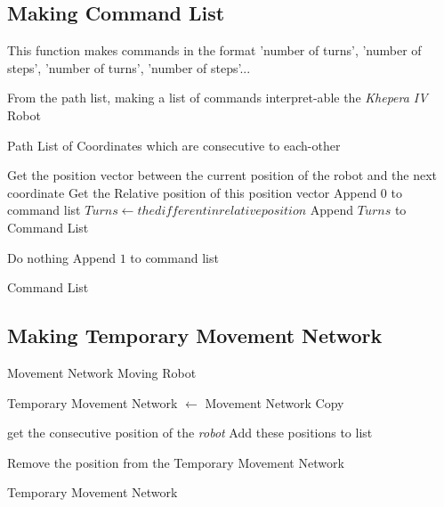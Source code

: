 \subsection{Making Command List}

This function makes commands in the format 'number of turns', 'number of steps', 'number of turns', 'number of steps'...

\label{function:make_command_list}
\begin{algorithm}
\caption{From the path list, making a list of commands interpret-able the \textit{Khepera IV} Robot}
\begin{algorithmic}
\REQUIRE Path List of Coordinates which are consecutive to each-other

    \STATE Get the position vector between the current position of the robot and the next coordinate
    \STATE Get the Relative position of this position vector
        \STATE Append $0$ to command list
        \STATE $Turns \leftarrow the different in relative position$
        \STATE Append $Turns$ to Command List 
    
    
        \STATE Do nothing
        \STATE Append $1$ to command list
    
    
\ENDIF
\ENDFOR

\RETURN Command List


\end{algorithmic}
\end{algorithm}


\subsection{Making Temporary Movement Network}
\label{function:}
\begin{algorithm}
\caption{}
\begin{algorithmic}

\REQUIRE Movement Network
\REQUIRE Moving Robot

\STATE Temporary Movement Network $\leftarrow$ Movement Network Copy 

    \STATE get the consecutive position of the \textit{robot}
    \STATE Add these positions to list
    
       \STATE Remove the position from the Temporary Movement Network
\ENDFOR
\ENDFOR


\RETURN Temporary Movement Network

\end{algorithmic}
\end{algorithm}


